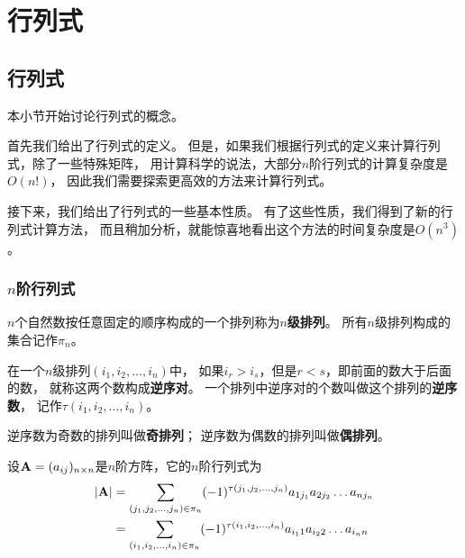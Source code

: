 \chapter{行列式}

\section{行列式}
本小节开始讨论行列式的概念。

首先我们给出了行列式的定义。
但是，如果我们根据行列式的定义来计算行列式，除了一些特殊矩阵，
用计算科学的说法，大部分$n$阶行列式的计算复杂度是$O(n!)$，
因此我们需要探索更高效的方法来计算行列式。

接下来，我们给出了行列式的一些基本性质。
有了这些性质，我们得到了新的行列式计算方法，
而且稍加分析，就能惊喜地看出这个方法的时间复杂度是$O(n^3)$。

\subsection{$n$阶行列式}
\begin{definition}[$n$级排列]
  $n$个自然数按任意固定的顺序构成的一个排列称为$n$\textbf{级排列}。
  所有$n$级排列构成的集合记作$\pi_n$。
\end{definition}

\begin{definition}[逆序数]
  在一个$n$级排列$(i_1,i_2,\dots,i_n)$中，
  如果$i_r>i_s$，但是$r<s$，即前面的数大于后面的数，
  就称这两个数构成\textbf{逆序对}。
  一个排列中逆序对的个数叫做这个排列的\textbf{逆序数}，
  记作$\tau(i_1,i_2,\dots,i_n)$。
\end{definition}

\begin{definition}[奇、偶排列]
  逆序数为奇数的排列叫做\textbf{奇排列}；
  逆序数为偶数的排列叫做\textbf{偶排列}。
\end{definition}

\begin{definition}[$n$阶行列式]
  设$\mathbf{A}=(a_{ij})_{n\times n}$是$n$阶方阵，它的$n$阶行列式为
  \begin{align*}
    |\mathbf{A}| &= \sum_{(j_1,j_2,\dots,j_n)\in\pi_n}
    (-1)^{\tau(j_1,j_2,\dots,j_n)}a_{1j_1}a_{2j_2}\dots a_{nj_n} \\
    &= \sum_{(i_1,i_2,\dots,i_n)\in\pi_n}
    (-1)^{\tau(i_1,i_2,\dots,i_n)}a_{i_1 1}a_{i_2 2}\dots a_{i_n n} 
  \end{align*}
\end{definition}


